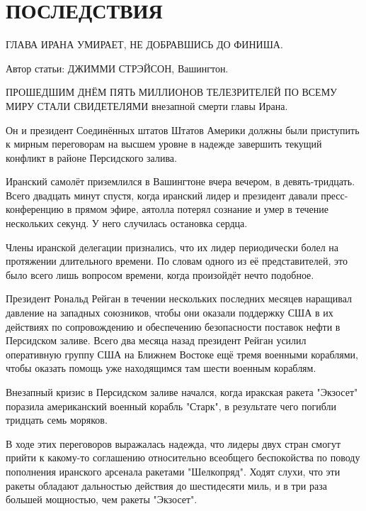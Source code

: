 \documentclass[a4paper,12pt]{book}
\begin{document}
\chapter{ПОСЛЕДСТВИЯ}
\begin{center}
ГЛАВА ИРАНА УМИРАЕТ, НЕ ДОБРАВШИСЬ ДО ФИНИША.\\
\end{center}
\par
\begin{center}
Автор статьи: ДЖИММИ СТРЭЙСОН, Вашингтон.\\
\end{center}
\par
ПРОШЕДШИМ ДНЁМ ПЯТЬ МИЛЛИОНОВ ТЕЛЕЗРИТЕЛЕЙ ПО ВСЕМУ МИРУ СТАЛИ СВИДЕТЕЛЯМИ внезапной смерти главы Ирана.
\par
Он и президент Соединённых штатов Штатов Америки должны были приступить к мирным переговорам на высшем уровне в надежде завершить текущий конфликт в районе Персидского залива.\\
\par
Иранский самолёт приземлился в Вашингтоне вчера вечером, в девять-тридцать. Всего двадцать минут спустя, когда иранский лидер и президент давали пресс-конференцию в прямом эфире, аятолла потерял сознание и умер в течение нескольких секунд. У него случилась остановка сердца.\\
\par
Члены иранской делегации признались, что их лидер периодически болел на протяжении длительного времени. По словам одного из её представителей, это было всего лишь вопросом времени, когда произойдёт нечто подобное.\\
\par
Президент Рональд Рейган в течении нескольких последних месяцев наращивал давление на западных союзников, чтобы они оказали поддержку США в их действиях по сопровождению и обеспечению безопасности поставок нефти в Персидском заливе. Всего два месяца назад президент Рейган усилил оперативную группу США на Ближнем Востоке ещё тремя военными кораблями, чтобы оказать помощь уже находящимся там шести военным кораблям.\\
\par
Внезапный кризис в Персидском заливе начался, когда иракская ракета "Экзосет" поразила американский военный корабль "Старк", в результате чего погибли тридцать семь моряков.\\
\par
В ходе этих переговоров выражалась надежда, что лидеры двух стран смогут прийти к какому-то соглашению относительно всеобщего беспокойства по поводу пополнения иранского арсенала ракетами "Шелкопряд". Ходят слухи, что эти ракеты обладают дальностью действия до шестидесяти миль, и в три раза большей мощностью, чем ракеты "Экзосет".\\
\end{document}
